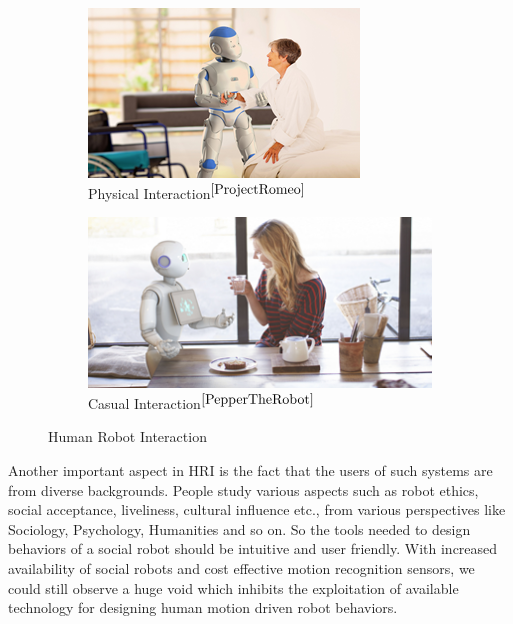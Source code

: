 \documentclass{llncs}
\begin{document}
\begin{figure}
\begin{subfigure}[t]{0.45\textwidth}
\includegraphics[width=\textwidth]{../thesis/assets/romeo_interaction.png}
\caption[Human Robot Interaction]{Physical Interaction$^{\cite{ProjectRomeo}}$ }
\end{subfigure}
\begin{subfigure}[t]{0.45\textwidth}
\includegraphics[width=\textwidth]{../thesis/assets/pepper_interaction.png}
\caption[Human Robot Interaction]{Casual Interaction$^{\cite{PepperTheRobot}}$ }
\end{subfigure}
\caption[Human Robot Interaction]{Human Robot Interaction}
\label{fig:hri}
\end{figure}
Another important aspect in HRI is the fact that the users of such systems are from diverse backgrounds. People study various aspects such as robot ethics, social acceptance, liveliness, cultural influence etc., from various perspectives like Sociology, Psychology, Humanities and so on. So the tools needed to design behaviors of a social robot should be intuitive and user friendly.  With increased availability of social robots and cost effective motion recognition sensors, we could still observe a huge void which inhibits the exploitation of available technology for designing human motion driven robot behaviors.
\end{document}
